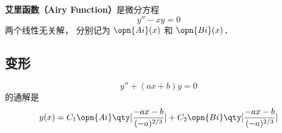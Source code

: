 
\begin{issues}
\issueDraft
\end{issues}

\textbf{艾里函数（Airy Function）}是微分方程
\begin{equation}
y'' - xy = 0
\end{equation}
两个线性无关解， 分别记为 $\opn{Ai}(x)$ 和 $\opn{Bi}(x)$．


\subsection{变形}
\begin{equation}
y'' + (ax + b) y = 0
\end{equation}
的通解是
\begin{equation}
y(x) = C_1\opn{Ai}\qty[\frac{-ax-b}{(-a)^{2/3}}] + C_2 \opn{Bi}\qty[\frac{-ax-b}{(-a)^{2/3}}]
\end{equation}


